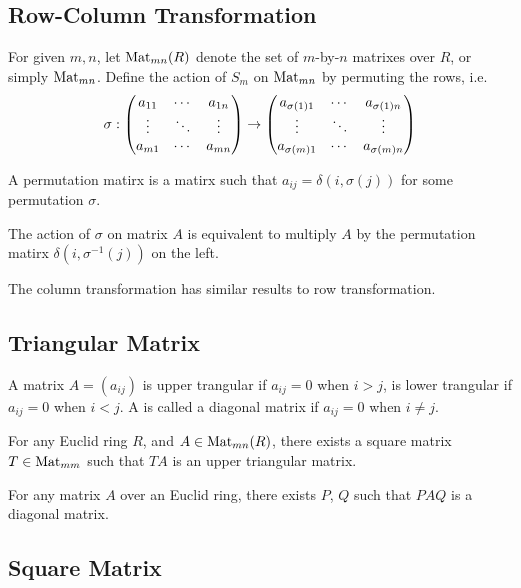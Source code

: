 \subsection{Row-Column Transformation}
For given $m, n$, let ${\mathop{\mathrm{Mat}}}_{mn}(R)$ denote the set of $m$-by-$n$ matrixes over $R$,
or simply ${\mathop{\mathrm{Mat}}}_{mn}$. Define the action of $S_m$ on ${\mathop{\mathrm{Mat}}}_{mn}$ by permuting
the rows, i.e.
\begin{equation*}
\sigma :
\left(\begin{matrix}
a_{11} & \cdots & a_{1n} \cr
\vdots & \ddots & \vdots \cr
a_{m1} & \cdots & a_{mn}
\end{matrix}\right)
\to
\left(\begin{matrix}
a_{\sigma(1) 1} & \cdots & a_{\sigma(1) n} \cr
\vdots & \ddots & \vdots \cr
a_{\sigma(m) 1} & \cdots & a_{\sigma(m) n}
\end{matrix}\right)
\end{equation*}

A permutation matirx is a matirx such that $a_{ij} = \delta(i, \sigma(j))$ for
some permutation $\sigma$.
\begin{pro}
The action of $\sigma$ on matrix $A$ is equivalent to multiply $A$ by the
permutation matirx $\delta(i, \sigma^{-1}(j))$ on the left.
\end{pro}

The column transformation has similar results to row transformation.

\subsection{Triangular Matrix}
A matrix $A = (a_{ij})$ is upper trangular if $a_{ij} = 0$ when $i > j$,
is lower trangular if $a_{ij} = 0$ when $i < j$.
A is called a diagonal matrix if $a_{ij} = 0$ when $i \neq j$.

\begin{pro}
For any Euclid ring $R$, and $A \in {\mathop{\mathrm{Mat}}}_{mn}(R)$, there exists a square matrix
$T \in {\mathop{\mathrm{Mat}}}_{mm}$ such that $TA$ is an upper triangular matrix.
\end{pro}

\begin{cly}
For any matrix $A$ over an Euclid ring, there exists $P$, $Q$ such
that $PAQ$ is a diagonal matrix.
\end{cly}

\subsection{Square Matrix}
